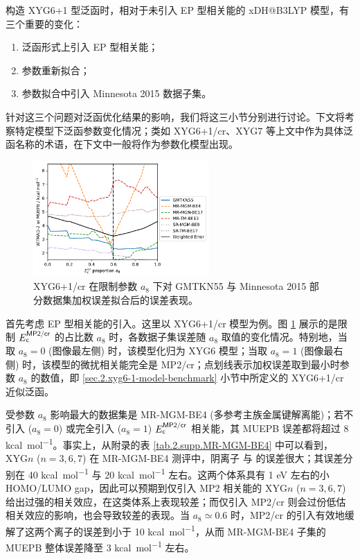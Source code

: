 构造 XYG6+1 型泛函时，相对于未引入 EP 型相关能的 xDH@B3LYP 模型，有三个重要的变化：
\begin{enumerate}[nosep]
  \item 泛函形式上引入 EP 型相关能；
  \item 参数重新拟合；
  \item 参数拟合中引入 Minnesota 2015 数据子集。
\end{enumerate}
针对这三个问题对泛函优化结果的影响，我们将这三小节分别进行讨论。下文将考察特定模型下泛函参数变化情况；类如 XYG6+1/cr、XYG7 等上文中作为具体泛函名称的术语，在下文中一般将作为参数化模型出现。

\begin{figure}[t]
  \centering
  \includegraphics[width=0.6\textwidth]{assets/plot-seq-cr-proportion.pdf}
  \caption[XYG6+1/cr 在限制参数 $E_\textmt{c}^\textmt{EP}$ 占比系数下的参数优化误差表现]{XYG6+1/cr 在限制参数 $a_8$ 下对 GMTKN55 与 Minnesota 2015 部分数据集加权误差拟合后的误差表现。}
  \label{fig.2.plot-seq-cr-proportion}
\end{figure}

首先考虑 EP 型相关能的引入。这里以 XYG6+1/cr 模型为例。图 \ref{fig.2.plot-seq-cr-proportion} 展示的是限制 $E_{\textsf{c}}^{\textsf{MP2/cr}}$ 的占比数 $a_8$ 时，各数据子集误差随 $a_8$ 取值的变化情况。特别地，当取 $a_8 = 0$ (图像最左侧) 时，该模型化归为 XYG6 模型；当取 $a_8 = 1$ (图像最右侧) 时，该模型的微扰相关能完全是 MP2/cr；点划线表示加权误差取到最小时参数 $a_8$ 的数值，即 \ref{sec.2.xyg6-1-model-benchmark} 小节中所定义的 XYG6+1/cr 近似泛函。

受参数 $a_8$ 影响最大的数据集是 MR-MGM-BE4 (多参考主族金属键解离能)；若不引入 ($a_8 = 0$) 或完全引入 ($a_8 = 1$) $E_{\textsf{c}}^{\textsf{MP2/cr}}$ 相关能，其 MUEPB 误差都将超过 8 \si{kcal.mol^{-1}}。事实上，从附录的表 \ref{tab.2.supp.MR-MGM-BE4} 中可以看到，XYG$n$ ($n=3,6,7$) 在 MR-MGM-BE4 测评中，阴离子  与  的误差很大；其误差分别在 40 \si{kcal.mol^{-1}} 与 20 \si{kcal.mol^{-1}} 左右。这两个体系具有 1 eV 左右的小 HOMO/LUMO gap，因此可以预期到仅引入 MP2 相关能的 XYG$n$ ($n=3,6,7$) 给出过强的相关效应，在这类体系上表现较差；而仅引入 MP2/cr 则会过份低估相关效应的影响，也会导致较差的表现。当 $a_8 \simeq 0.6$ 时，MP2/cr 的引入有效地缓解了这两个离子的误差到小于 10 \si{kcal.mol^{-1}}，从而 MR-MGM-BE4 子集的 MUEPB 整体误差降至 3 \si{kcal.mol^{-1}} 左右。

